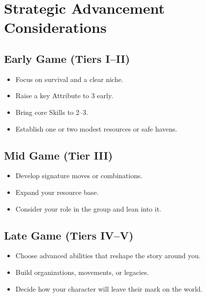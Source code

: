 \section{Strategic Advancement Considerations}
\label{sec:advancement-strategy}

\subsection{Early Game (Tiers I–II)}
\label{sec:early-game}
\begin{itemize}
  \item Focus on survival and a clear niche.
  \item Raise a key Attribute to 3 early.
  \item Bring core Skills to 2–3.
  \item Establish one or two modest resources or safe havens.
\end{itemize}

\subsection{Mid Game (Tier III)}
\label{sec:mid-game}
\begin{itemize}
  \item Develop signature moves or combinations.
  \item Expand your resource base.
  \item Consider your role in the group and lean into it.
\end{itemize}

\subsection{Late Game (Tiers IV–V)}
\label{sec:late-game}
\begin{itemize}
  \item Choose advanced abilities that reshape the story around you.
  \item Build organizations, movements, or legacies.
  \item Decide how your character will leave their mark on the world.
\end{itemize}

